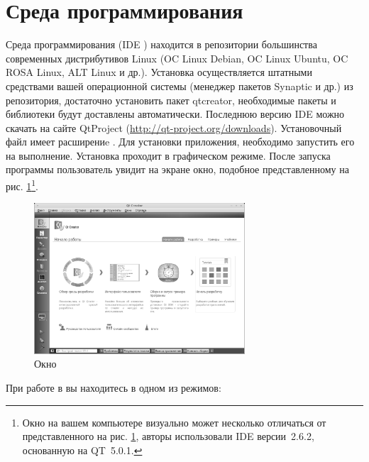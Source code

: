 \section[Среда программирования \Sys{Qt Creator}]{Среда программирования }
Среда программирования  
(IDE ) находится в репозитории
большинства современных дистрибутивов Linux (OC Linux Debian, OC Linux Ubuntu, OC ROSA Linux, ALT Linux и др.).
Установка осуществляется штатными средствами вашей операционной системы (менеджер пакетов Synaptic и др.) из
репозитория, достаточно установить пакет qtcreator, необходимые пакеты и библиотеки будут доставлены  автоматически.
Последнюю версию IDE  можно скачать на сайте QtProject (\url{http://qt-project.org/downloads}). 
Установочный файл имеет расширениe . Для установки приложения, необходимо запустить его на выполнение.
Установка проходит в графическом режиме. После запуска программы пользователь увидит на экране окно, подобное
представленному на рис. \ref{ch01:refDrawing0}\footnote{Окно на вашем компьютере визуально может несколько отличаться от
представленного на рис. \ref{ch01:refDrawing0}, авторы использовали IDE  версии~2.6.2, основанную на QT~5.0.1.}.


\begin{figure}[htb]
\begin{center}
\includegraphics[width=0.7\textwidth]{img/ris_1_1_rus}
\caption{Окно }
\label{ch01:refDrawing0}
\end{center}
\end{figure}
При работе в  вы находитесь в одном из режимов:

